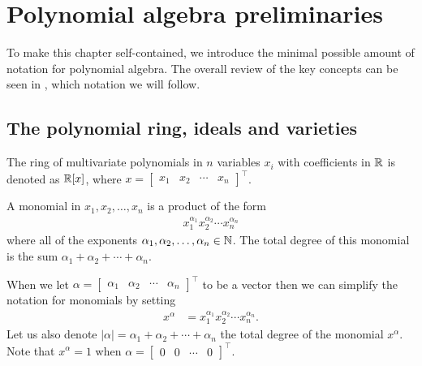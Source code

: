 \section{Polynomial algebra preliminaries}
To make this chapter self-contained, we introduce the minimal possible amount of notation for polynomial algebra.
The overall review of the key concepts can be seen in \cite{Cox-Little-Shea2015}, which notation we will follow.

\subsection{The polynomial ring, ideals and varieties}
The ring of multivariate polynomials in $n$ variables $x_i$ with coefficients in $\mathbb{R}$ is denoted as $\mathbb{R}[x]$, where $x = \begin{bmatrix}x_1 & x_2 & \cdots & x_n\end{bmatrix}^\top$.

\begin{definition}
  A monomial in $x_1, x_2, \ldots , x_n$ is a product of the form
  \begin{align}
    x_1^{\alpha_1} x_2^{\alpha_2} \cdots x_n^{\alpha_n}
  \end{align}
  where all of the exponents $\alpha_1, \alpha_2, \ldots, \alpha_n \in \mathbb{N}$.
  The total degree of this monomial is the sum $\alpha_1 + \alpha_2 + \cdots + \alpha_n$.
\end{definition}

When we let $\alpha = \begin{bmatrix}\alpha_1 & \alpha_2 & \cdots & \alpha_n\end{bmatrix}^\top$ to be a vector then we can simplify the notation for monomials by setting
\begin{align}
  x^\alpha &= x_1^{\alpha_1} x_2^{\alpha_2} \cdots x_n^{\alpha_n}.
\end{align}
Let us also denote $|\alpha| = \alpha_1 + \alpha_2 + \cdots + \alpha_n$ the total degree of the monomial $x^\alpha$.
Note that $x^\alpha = 1$ when $\alpha = \begin{bmatrix}0 & 0 & \cdots & 0\end{bmatrix}^\top$.
